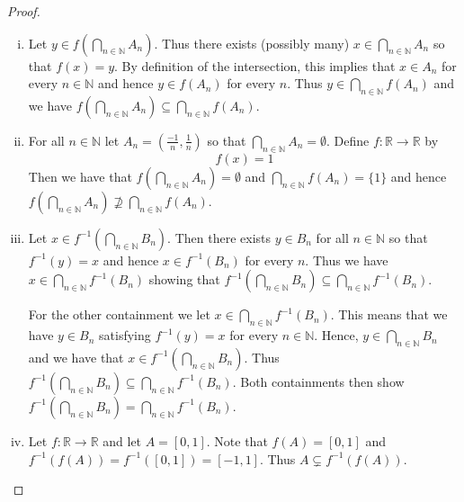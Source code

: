 \documentclass[leqno]{article}
\theoremstyle{nonumberplain}
\newtheorem{proof}{Proof}
\newcommand{\R}{\mathbb{R}}
\newcommand{\N}{\mathbb{N}}
\begin{document}
\begin{proof}~
\begin{enumerate}[(i)]
\item Let $y\in f\left( \bigcap_{n\in \N} A_n \right)$.  Thus there exists (possibly many) $x \in \bigcap_{n\in \N} A_n$ so that $f(x)=y$.  By definition of the intersection, this implies that $x\in A_n$ for every $n\in \N$ and hence $y\in f(A_n)$ for every $n$.  Thus $y\in \bigcap_{n\in \N} f(A_n)$ and we have $f \left( \bigcap_{n\in \N} A_n \right) \subseteq \bigcap_{n\in \N} f(A_n)$.

\item For all $n \in \N$ let $A_n = \left( \frac{-1}{n}, \frac{1}{n} \right)$ so that $\bigcap_{n\in \N} A_n = \emptyset$. Define $f \colon \R \to \R$ by 
\[
f(x)=1
\]
Then we have that $f\left( \bigcap_{n\in \N} A_n \right) = \emptyset$ and $\bigcap_{n\in \N} f(A_n)=\{1\}$ and hence $f\left( \bigcap_{n\in \N} A_n \right) \nsupseteq\bigcap_{n\in \N} f(A_n)$. 

\item Let $x\in f^{-1}\left(\bigcap_{n\in \N} B_n \right)$. Then there exists $y\in B_n$ for all $n\in \N$ so that $f^{-1}(y)=x$ and hence $x\in f^{-1}(B_n)$ for every $n$. Thus we have $x \in \bigcap_{n \in \N} f^{-1}(B_n)$ showing that $f^{-1}\left( \bigcap_{n\in \N} B_n \right) \subseteq \bigcap_{n\in \N} f^{-1}(B_n)$.  

For the other containment we let $x \in \bigcap_{n\in \N} f^{-1}(B_n)$.  This means that we have $y \in B_n$ satisfying $f^{-1}(y)=x$ for every $n\in \N$. Hence, $y\in \bigcap_{n\in \N} B_n$ and we have that $x\in f^{-1}\left(\bigcap_{n\in \N} B_n \right)$.  Thus $f^{-1}\left( \bigcap_{n\in \N} B_n \right) \subseteq \bigcap_{n\in \N} f^{-1}(B_n)$.  Both containments then show  $f^{-1}(\bigcap_{n \in \mathbb{N}} B_n) = \bigcap_{n \in \mathbb{N}} f^{-1}(B_n)$.

\item Let $f\colon \R \to \R$ and let $A=[0,1]$.  Note that $f(A)=[0,1]$ and $f^{-1}(f(A))=f^{-1}([0,1])=[-1,1]$. Thus $A\subsetneq f^{-1}(f(A))$.
\end{enumerate}
\end{proof}



\pagebreak

\end{document}
